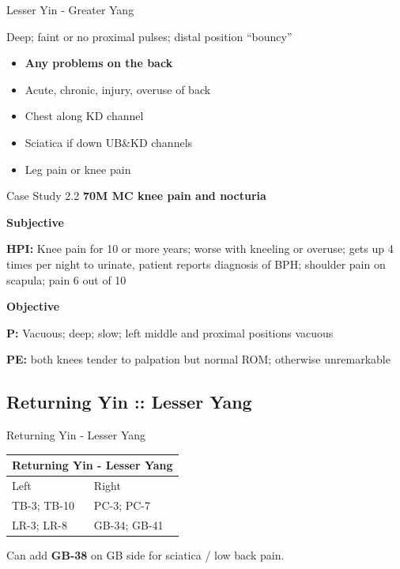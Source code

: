 \begin{frame}{Lesser Yin - Greater Yang}

\begin{pulse}
Deep; faint or no proximal pulses; distal position ``bouncy''
\end{pulse}

\begin{itemize}
\item \textbf{Any problems on the back}
\item Acute, chronic, injury, overuse of back
\item Chest along KD channel 
\item Sciatica if down UB\&KD channels
\item Leg pain or knee pain
\end{itemize}

\end{frame}

\begin{frame}{Case Study 2.2}
  \textbf{\Large 70M MC knee pain and nocturia}
  
  \textbf{\large Subjective}
  
  \textbf{HPI:} Knee pain for 10 or more years; worse with kneeling or overuse; gets up 4 times per night to urinate, patient reports diagnosis of BPH; shoulder pain on scapula; pain 6 out of 10

  \textbf{\large Objective}
  
  \textbf{P:} Vacuous; deep; slow; left middle and proximal positions vacuous

  \textbf{PE:} both knees tender to palpation but normal ROM; otherwise unremarkable

\end{frame}

\subsection{Returning Yin :: Lesser Yang}

\begin{frame}{Returning Yin - Lesser Yang}

\begin{table}[]
\begin{tabular}{@{}ll@{}}
\toprule
\multicolumn{2}{l}{Returning Yin - Lesser Yang} \\ \midrule
Left                   & Right                  \\
TB-3; TB-10            & PC-3; PC-7             \\
LR-3; LR-8             & GB-34; GB-41           \\ \bottomrule
\end{tabular}
\end{table}

\vspace{2em}

Can add \textbf{GB-38} on GB side for sciatica / low back pain.

\end{frame}

